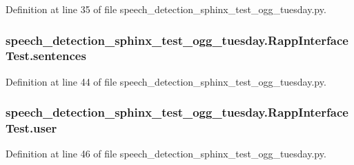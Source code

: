 Definition at line 35 of file speech\-\_\-detection\-\_\-sphinx\-\_\-test\-\_\-ogg\-\_\-tuesday.\-py.

\hypertarget{classspeech__detection__sphinx__test__ogg__tuesday_1_1RappInterfaceTest_ae7caa49927e4c5766b5fbf1c638eafbc}{
\subsubsection[{sentences}]{\setlength{\rightskip}{0pt plus 5cm}speech\-\_\-detection\-\_\-sphinx\-\_\-test\-\_\-ogg\-\_\-tuesday.\-Rapp\-Interface\-Test.\-sentences}}\label{classspeech__detection__sphinx__test__ogg__tuesday_1_1RappInterfaceTest_ae7caa49927e4c5766b5fbf1c638eafbc}


Definition at line 44 of file speech\-\_\-detection\-\_\-sphinx\-\_\-test\-\_\-ogg\-\_\-tuesday.\-py.

\hypertarget{classspeech__detection__sphinx__test__ogg__tuesday_1_1RappInterfaceTest_aabf71ed2a48f5f43b345f9df87c020a2}{
\subsubsection[{user}]{\setlength{\rightskip}{0pt plus 5cm}speech\-\_\-detection\-\_\-sphinx\-\_\-test\-\_\-ogg\-\_\-tuesday.\-Rapp\-Interface\-Test.\-user}}\label{classspeech__detection__sphinx__test__ogg__tuesday_1_1RappInterfaceTest_aabf71ed2a48f5f43b345f9df87c020a2}


Definition at line 46 of file speech\-\_\-detection\-\_\-sphinx\-\_\-test\-\_\-ogg\-\_\-tuesday.\-py.

